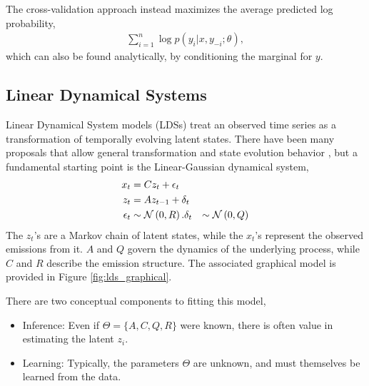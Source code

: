\documentclass[14pt]{extarticle}
\begin{document}
The cross-validation approach instead maximizes the average predicted log probability,
\begin{align*}
\sum_{i = 1}^{n} \log p\left(y_{i} \vert x, y_{-i}; \theta\right),
\end{align*}
which can also be found analytically, by conditioning the marginal for $y$.


\subsection{Linear Dynamical Systems}
\label{subsec:linear_dynamical_systems}

Linear Dynamical System models (LDSs) treat an observed time series as a
transformation of temporally evolving latent states.
There have been many proposals that allow general transformation and state
evolution behavior \citep{hostetler1983nonlinear, wan2000unscented}, but a
fundamental starting point is the Linear-Gaussian dynamical system,
\begin{align*}
  x_{t} &= C z_{t} + \epsilon_{t} \\
  z_{t} &= A z_{t - 1} + \delta_{t} \\
  \epsilon_{t} &\sim \mathcal{N}\left(0, R\right).
  \delta_{t} &\sim \mathcal{N}\left(0, Q\right) \\
\end{align*}
The $z_{t}$'s are a Markov chain of latent states, while the $x_{t}$'s represent
the observed emissions from it. $A$ and $Q$ govern the dynamics of the
underlying process, while $C$ and $R$ describe the emission structure. The
associated graphical model is provided in Figure \ref{fig:lds_graphical}.

There are two conceptual components to fitting this model,
\begin{itemize}
\item Inference: Even if $\Theta = \{A, C, Q, R\}$ were known, there
  is often value in estimating the latent $z_{i}$.
\item Learning: Typically, the parameters $\Theta$ are unknown, and must
  themselves be learned from the data.
\end{itemize}
\end{document}
